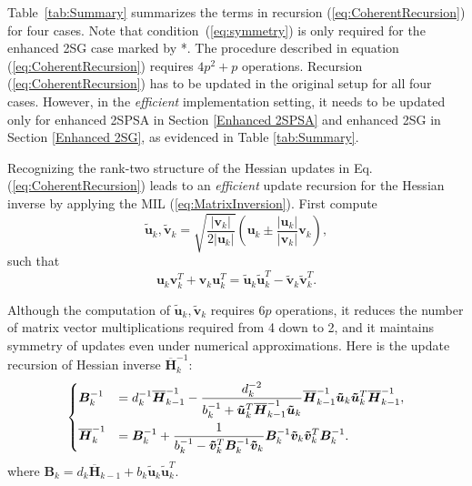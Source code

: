 \documentclass[conference]{IEEEtran}
\newcommand{\oH}{\bm{\overline{H}}}
\begin{document}
Table~\ref{tab:Summary} summarizes the terms in recursion
(\ref{eq:CoherentRecursion}) for four cases. Note that
condition~(\ref{eq:symmetry}) is only required for the
enhanced 2SG case marked by *. The procedure described in equation
(\ref{eq:CoherentRecursion}) requires $4p^2 + p$ operations. Recursion
(\ref{eq:CoherentRecursion}) has to be updated in the original setup
for all four cases. However, in the \textit{efficient} implementation
setting, it needs to be updated only for enhanced 2SPSA in
Section \ref{Enhanced 2SPSA} and enhanced 2SG in Section
\ref{Enhanced 2SG}, as evidenced in Table \ref{tab:Summary}.

Recognizing the rank-two structure of the Hessian updates in Eq. (\ref{eq:CoherentRecursion}) leads to
an \textit{efficient} update recursion for the Hessian inverse by applying the MIL (\ref{eq:MatrixInversion}). First compute
\begin{equation} \label{eq:Transform}
 \bm{\tilde{u}}_k, \bm{\tilde{v}}_k =
  \sqrt{\frac{|\bm{v}_k|}{2|\bm{u}_k|}} (\bm{u}_k \pm
  \frac{|\bm{u}_k|}{|\bm{v}_k|}\bm{v}_k),
\end{equation}
such that
\begin{equation*} \bm{u}_k \bm{v}_k^{T}+\bm{v}_k \bm{u}_k^{T}
  = \bm{\tilde{u}}_k \bm{\tilde{u}}_k^{T} - \bm{\tilde{v}}_k
  \bm{\tilde{v}}_k^{T}.
\end{equation*}

Although the computation of $\bm{\tilde{u}}_k,
\bm{\tilde{v}}_k$ requires $6p$ operations, it reduces the number of
matrix vector multiplications required from 4 down to 2, and it
maintains symmetry of updates even under numerical approximations. Here is the update recursion of Hessian inverse $\oH_k^{-1}$:
\begin{equation} \label{eq:SequentialUpdate}
  \begin{dcases} \bm{B}_k^{-1} &= d_k^{-1}\oH_{k-1}^{-1}
    -
    \frac{d_k^{-2}}{b_k^{-1}+\bm{\tilde{u}}_k^{T}\oH_{k-1}^{-1}\bm{\tilde{u}}_k}
    \oH_{k-1}^{-1}\bm{\tilde{u}}_k \bm{\tilde{u}}_k^{T}\oH_{k-1}^{-1},\\
    \oH_k^{-1} &=\bm{B}_k^{-1} +
    \frac{1}{b_k^{-1}-\bm{\tilde{v}}_k^{T}\bm{B}_k^{-1}\bm{\tilde{v}}_k}
    \bm{B}_k^{-1}\bm{\tilde{v}}_k \bm{\tilde{v}}_k^{T}\bm{B}_{k}^{-1}.
  \end{dcases}
\end{equation}
where $\bm{B}_k=d_k\oH_{k-1}+b_k\bm{\tilde{u}}_k  \bm{\tilde{u}}_k^{T}$.
\end{document}

